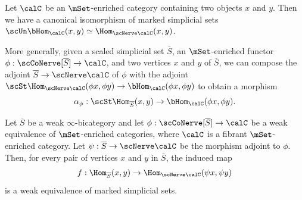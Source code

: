\begin{remark}\label{pal}
Let $\calC$ be an $\mSet$-enriched category containing two objects $x$ and $y$. Then
we have a canonical isomorphism of marked simplicial sets $\scUn \bHom_{\calC}(x,y)
\simeq \Hom_{ \scNerve \calC}(x,y)$. 

More generally, given a scaled simplicial set $\overline{S}$, an $\mSet$-enriched functor
$\phi: \scCoNerve[ \overline{S} ] \rightarrow \calC$, and two vertices $x$ and $y$ of $\overline{S}$, we can compose the adjoint $\overline{S} \rightarrow \scNerve \calC$ of $\phi$ with the adjoint
$\scSt \Hom_{ \scNerve \calC}( \phi x, \phi y) \rightarrow \bHom_{\calC}( \phi x, \phi y)$ to obtain a morphism
$$ \alpha_{\phi}: \scSt \Hom_{ \overline{S} }(x,y) \rightarrow \bHom_{\calC}( \phi x, \phi y).$$
\end{remark}

\begin{theorem}\label{csi}
Let $\overline{S}$ be a weak $\infty$-bicategory and let $\phi: \scCoNerve[ \overline{S}] \rightarrow \calC$ be a weak equivalence of $\mSet$-enriched categories, where $\calC$ is a fibrant $\mSet$-enriched category. Let $\psi: \overline{S} \rightarrow \scNerve \calC$ be the morphism adjoint to $\phi$.
Then, for every pair of vertices $x$ and $y$ in $\overline{S}$, the induced map
$$ f: \Hom_{\overline{S}}(x,y) \rightarrow \Hom_{ \scNerve \calC}( \psi x, \psi y)$$
is a weak equivalence of marked simplicial sets.
\end{theorem}

